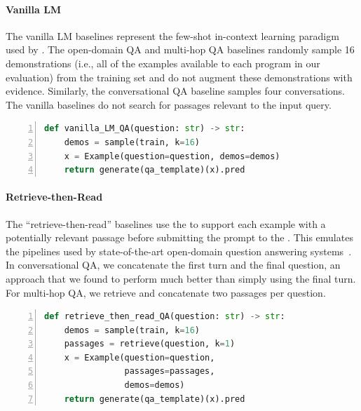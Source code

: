 \paragraph{Vanilla LM} The vanilla LM baselines represent the few-shot in-context learning paradigm used by \citet{brown2020language}. The open-domain QA and multi-hop QA baselines randomly sample 16 demonstrations (i.e., all of the examples available to each program in our evaluation) from the training set and do not augment these demonstrations with evidence. Similarly, the conversational QA baseline samples four conversations. The vanilla baselines do not  search for passages relevant to the input query.

\begin{lstlisting}[numbers=left,language=Python,breaklines=true]
def vanilla_LM_QA(question: str) -> str:
    demos = sample(train, k=16)
    x = Example(question=question, demos=demos)
    return generate(qa_template)(x).pred
\end{lstlisting}

\paragraph{Retrieve-then-Read} The ``retrieve-then-read'' baselines use the \RM{} to support each example with a potentially relevant passage before submitting the prompt to the \LM{}. This emulates the pipelines used by state-of-the-art open-domain question answering systems~\cite{khattab2021relevance,izacard2020leveraging,hofstatter2022fid}. In conversational QA, we concatenate the first turn and the final question, an approach that we found to perform much better than simply using the final turn. For multi-hop QA, we retrieve and concatenate two passages per question.

\begin{lstlisting}[numbers=left,language=Python,breaklines=true]
def retrieve_then_read_QA(question: str) -> str:
    demos = sample(train, k=16)
    passages = retrieve(question, k=1)
    x = Example(question=question,
                passages=passages,
                demos=demos)
    return generate(qa_template)(x).pred
\end{lstlisting}



